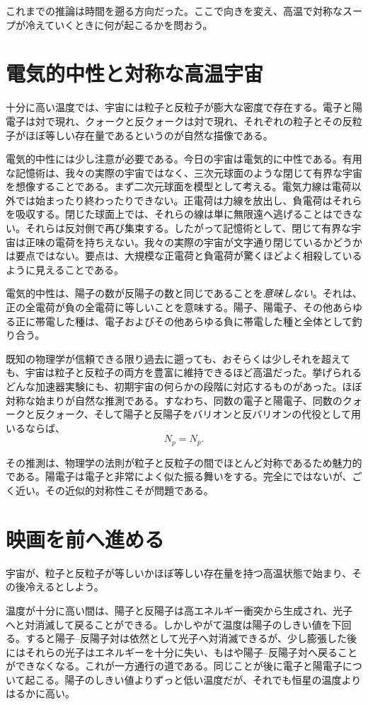 これまでの推論は時間を遡る方向だった。ここで向きを変え、高温で対称なスープが冷えていくときに何が起こるかを問おう。

\section{電気的中性と対称な高温宇宙}

十分に高い温度では、宇宙には粒子と反粒子が膨大な密度で存在する。電子と陽電子は対で現れ、クォークと反クォークは対で現れ、それぞれの粒子とその反粒子がほぼ等しい存在量であるというのが自然な描像である。

電気的中性には少し注意が必要である。今日の宇宙は電気的に中性である。有用な記憶術は、我々の実際の宇宙ではなく、三次元球面のような閉じて有界な宇宙を想像することである。まず二次元球面を模型として考える。電気力線は電荷以外では始まったり終わったりできない。正電荷は力線を放出し、負電荷はそれらを吸収する。閉じた球面上では、それらの線は単に無限遠へ逃げることはできない。それらは反対側で再び集束する。したがって記憶術として、閉じて有界な宇宙は正味の電荷を持ちえない。我々の実際の宇宙が文字通り閉じているかどうかは要点ではない。要点は、大規模な正電荷と負電荷が驚くほどよく相殺しているように見えることである。

電気的中性は、陽子の数が反陽子の数と同じであることを\emph{意味しない}。それは、正の全電荷が負の全電荷に等しいことを意味する。陽子、陽電子、その他あらゆる正に帯電した種は、電子およびその他あらゆる負に帯電した種と全体として釣り合う。

既知の物理学が信頼できる限り過去に遡っても、おそらくは少しそれを超えても、宇宙は粒子と反粒子の両方を豊富に維持できるほど高温だった。挙げられるどんな加速器実験にも、初期宇宙の何らかの段階に対応するものがあった。ほぼ対称な始まりが自然な推測である。すなわち、同数の電子と陽電子、同数のクォークと反クォーク、そして陽子と反陽子をバリオンと反バリオンの代役として用いるならば、
\[
N_p = N_{\bar p}.
\]

その推測は、物理学の法則が粒子と反粒子の間でほとんど対称であるため魅力的である。陽電子は電子と非常によく似た振る舞いをする。完全にではないが、ごく近い。その近似的対称性こそが問題である。

\section{映画を前へ進める}

宇宙が、粒子と反粒子が等しいかほぼ等しい存在量を持つ高温状態で始まり、その後冷えるとしよう。

温度が十分に高い間は、陽子と反陽子は高エネルギー衝突から生成され、光子へと対消滅して戻ることができる。しかしやがて温度は陽子のしきい値を下回る。すると陽子--反陽子対は依然として光子へ対消滅できるが、少し膨張した後にはそれらの光子はエネルギーを十分に失い、もはや陽子--反陽子対へ戻ることができなくなる。これが一方通行の道である。同じことが後に電子と陽電子について起こる。陽子のしきい値よりずっと低い温度だが、それでも恒星の温度よりはるかに高い。

